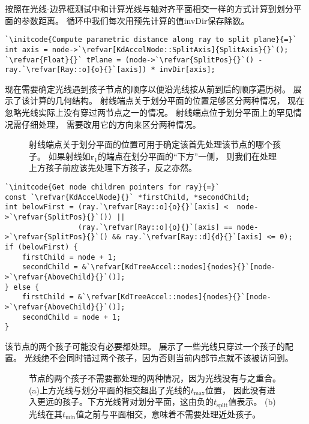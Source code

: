 按照在光线-边界框测试中和计算光线与轴对齐平面相交一样的方式计算到划分平面的参数距离。
循环中我们每次用预先计算的值{\ttfamily invDir}保存除数。
\begin{lstlisting}
`\initcode{Compute parametric distance along ray to split plane}{=}`
int axis = node->`\refvar[KdAccelNode::SplitAxis]{SplitAxis}{}`();
`\refvar{Float}{}` tPlane = (node->`\refvar{SplitPos}{}`() - ray.`\refvar[Ray::o]{o}{}`[axis]) * invDir[axis];
\end{lstlisting}

现在需要确定光线遇到孩子节点的顺序以便沿光线按从前到后的顺序遍历树。
展示了该计算的几何结构。
射线端点关于划分平面的位置足够区分两种情况，
现在忽略光线实际上没有穿过两节点之一的情况。
射线端点位于划分平面上的罕见情况需仔细处理，
需要改用它的方向来区分两种情况。
\begin{figure}[htbp]
    \centering
    \caption{射线端点关于划分平面的位置可用于确定该首先处理该节点的哪个孩子。
    如果射线如$\bm r_1$的端点在划分平面的“下方”一侧，
    则我们在处理上方孩子前应该先处理下方孩子，反之亦然。}
    \label{fig:4.18}
\end{figure}
\begin{lstlisting}
`\initcode{Get node children pointers for ray}{=}`
const `\refvar{KdAccelNode}{}` *firstChild, *secondChild;
int belowFirst = (ray.`\refvar[Ray::o]{o}{}`[axis] <  node->`\refvar{SplitPos}{}`()) ||
                 (ray.`\refvar[Ray::o]{o}{}`[axis] == node->`\refvar{SplitPos}{}`() && ray.`\refvar[Ray::d]{d}{}`[axis] <= 0);
if (belowFirst) {
    firstChild = node + 1;
    secondChild = &`\refvar[KdTreeAccel::nodes]{nodes}{}`[node->`\refvar{AboveChild}{}`()];
} else {
    firstChild = &`\refvar[KdTreeAccel::nodes]{nodes}{}`[node->`\refvar{AboveChild}{}`()];
    secondChild = node + 1;
}
\end{lstlisting}

该节点的两个孩子可能没有必要都处理。
展示了一些光线只穿过一个孩子的配置。
光线绝不会同时错过两个孩子，因为否则当前内部节点就不该被访问到。
\begin{figure}[htbp]
    \centering
    \caption{节点的两个孩子不需要都处理的两种情况，因为光线没有与之重合。
    (a)上方光线与划分平面的相交超出了光线的$t_{\max}$位置，
    因此没有进入更远的孩子。下方光线背对划分平面，这由负的$t_{\text{split}}$值表示。
    (b)光线在其$t_{\min}$值之前与平面相交，意味着不需要处理近处孩子。}
    \label{fig:4.19}
\end{figure}

